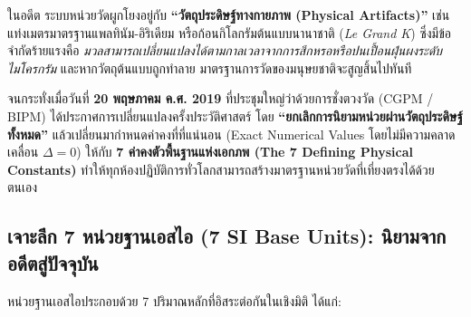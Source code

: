 \begin{conceptbox}
ในอดีต ระบบหน่วยวัดผูกโยงอยู่กับ \textbf{``วัตถุประดิษฐ์ทางกายภาพ (Physical Artifacts)''} เช่น แท่งเมตรมาตรฐานแพลทินัม-อิริเดียม หรือก้อนกิโลกรัมต้นแบบนานาชาติ (\textit{Le Grand K}) ซึ่งมีข้อจำกัดร้ายแรงคือ \textit{มวลสามารถเปลี่ยนแปลงได้ตามกาลเวลาจากการสึกหรอหรือปนเปื้อนฝุ่นผงระดับไมโครกรัม} และหากวัตถุต้นแบบถูกทำลาย มาตรฐานการวัดของมนุษยชาติจะสูญสิ้นไปทันที

จนกระทั่งเมื่อวันที่ \textbf{20 พฤษภาคม ค.ศ. 2019} ที่ประชุมใหญ่ว่าด้วยการชั่งตวงวัด (CGPM / BIPM) ได้ประกาศการเปลี่ยนแปลงครั้งประวัติศาสตร์ โดย \textbf{``ยกเลิกการนิยามหน่วยผ่านวัตถุประดิษฐ์ทั้งหมด''} แล้วเปลี่ยนมากำหนดค่าคงที่ที่แน่นอน (Exact Numerical Values โดยไม่มีความคลาดเคลื่อน $\Delta = 0$) ให้กับ \textbf{7 ค่าคงตัวพื้นฐานแห่งเอกภพ (The 7 Defining Physical Constants)} ทำให้ทุกห้องปฏิบัติการทั่วโลกสามารถสร้างมาตรฐานหน่วยวัดที่เที่ยงตรงได้ด้วยตนเอง
\end{conceptbox}



\subsection{เจาะลึก 7 หน่วยฐานเอสไอ (7 SI Base Units): นิยามจากอดีตสู่ปัจจุบัน}

หน่วยฐานเอสไอประกอบด้วย 7 ปริมาณหลักที่อิสระต่อกันในเชิงมิติ ได้แก่:

